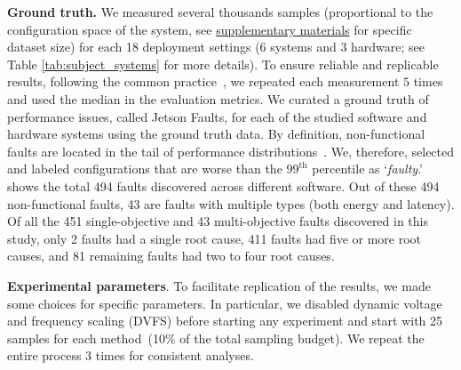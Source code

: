 
\noindent \textbf{Ground truth.} We measured several thousands samples (proportional to the configuration space of the system, see \href{https://github.com/softsys4ai/unicorn}{\color{blue!80}supplementary materials} for specific dataset size) for each 18 deployment settings (6 systems and 3 hardware; see Table \ref{tab:subject_systems} for more details). To ensure reliable and replicable results, following the common practice~\cite{ding2021generalizable,JSVKPA:ASE17,curtsinger2013stabilizer,kaltenecker2020interplay}, we repeated each measurement $5$ times and used the median in the evaluation metrics. 
We curated a ground truth of performance issues, called {\sc Jetson Faults}, for each of the studied software and hardware systems using the ground truth data. By definition, non-functional faults are located in the tail of performance distributions~\cite{gunawi2018fail,kleppmann2017designing}. We, therefore, selected and labeled configurations that are worse than the $99^\text{th}$ percentile as `\textit{faulty}.' ~ shows the total 494 faults discovered across different software. Out of these 494 non-functional faults, 43 are faults with multiple types (both energy and latency). Of all the 451 single-objective and 43 multi-objective faults discovered in this study, only 2 faults had a single root cause, 411 faults had five or more root causes, and 81 remaining faults had two to four root causes. 

\noindent \textbf{Experimental parameters}. To facilitate replication of the results, we made some choices for specific parameters. In particular, we disabled dynamic voltage and frequency scaling (DVFS) before starting any experiment and start with 25 samples for each method~(10\% of the total sampling budget). We repeat the entire process 3 times for consistent analyses.


